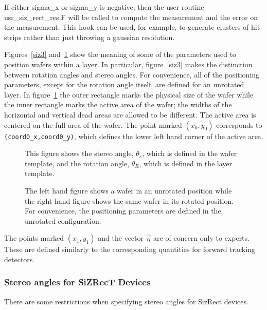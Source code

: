 If either sigma\_x or sigma\_y is negative, then the user
routine usr\_siz\_rect\_res.F will be called to compute the
measurement and the error on the measurement.  This hook can be
used, for example, to generate clusters of hit strips rather
than just throwing a gaussian resolution.

Figures~\ref{siz3} and~\ref{siz4} show the meaning of some of the
parameters used to position wafers within a layer.  In particular,
figure~\ref{siz3} makes the distinction between rotation angles and
stereo angles.  For convenience, all of the positioning parameters,
except for the rotation angle itself, are defined for an unrotated layer.
In figure~\ref{siz4} the outer rectangle marks the physical size of
the wafer while the inner rectangle marks the active area of the wafer;
the widths of the horizontal and vertical dead areas are
allowed to be different.   The active area is centered on the full 
area of the wafer.  The point marked $(x_0,y_0)$ corresponds to 
{\tt (coord0\_x,coord0\_y)}, which defines the lower left hand 
corner of the active area.


\begin{figure} [htbp]
\begin{center}
\centerline{\epsfysize=3.0in }
\caption{\label{siz3} This figure shows the stereo angle, $\theta_s$,
                      which is defined in the wafer template,
                      and the rotation angle, $\theta_R$,
                      which is defined in the layer template.}
\centerline{\epsfysize=3.0in }
\caption{\label{siz4} The left hand figure shows a wafer in an unrotated
position while the right hand figure shows the same wafer in its
rotated position.   For convenience, the positioning parameters
are defined in the unrotated configuration.}
\end{center}
\end{figure}

The points marked $(x_1,y_1)$ and the vector $\vec{\eta}$ are of
concern only to experts.  These are defined similarly to the
corresponding quantities for forward tracking detectors.

\subsubsection{Stereo angles for SiZRecT Devices}

There are some restrictions when specifying stereo
angles for SizRect devices.  

